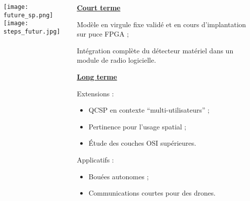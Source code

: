 \documentclass[../main.tex]{subfiles}
\begin{document}
\begin{frame}{\subsecname}
  \begin{columns}
    \begin{column}{.3 \linewidth}
      \hfill \texttt{[image: future\_sp.png]} \\
      \texttt{[image: steps\_futur.jpg]}
    \end{column}
    \begin{column}{.7 \linewidth}
      {\centering \underline{\textbf{Court terme}}\par}
      \begin{ctrlitemize}{.2 em} \small
        \item Modèle en virgule fixe validé et en cours d'implantation sur puce FPGA ;
        \item Intégration complète du détecteur matériel dans un module de radio logicielle.
      \end{ctrlitemize}

      {\centering \underline{\textbf{Long terme}}\par}
      \begin{ctrlitemize}{.2 em} \small
        \item Extensions :
        \begin{itemize}
          \item QCSP en contexte ``multi-utilisateurs'' ;
          \item Pertinence pour l'usage spatial ;
          \item Étude des couches OSI supérieures.
        \end{itemize}
        \item Applicatifs :
        \begin{itemize}
          \item Bouées autonomes ;
          \item Communications courtes pour des drones. 
        \end{itemize}
      \end{ctrlitemize}
    \end{column}
  \end{columns}
\end{frame}
\end{document}
